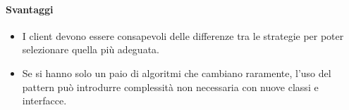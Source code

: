 \paragraph{Svantaggi}
\begin{itemize}
    \item I client devono essere consapevoli delle differenze tra le strategie per poter selezionare quella più adeguata.
    \item Se si hanno solo un paio di algoritmi che cambiano raramente, l'uso del pattern può introdurre complessità non necessaria con nuove classi e interfacce.
\end{itemize}


\newpage